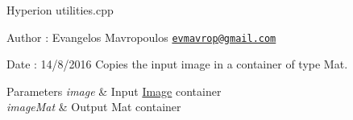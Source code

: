 Hyperion utilities.\+cpp

\begin{DoxyAuthor}{Author}
\+: Evangelos Mavropoulos \href{mailto:evmavrop@gmail.com}{\tt evmavrop@gmail.\+com} 
\end{DoxyAuthor}
\begin{DoxyDate}{Date}
\+: 14/8/2016 Copies the input image in a container of type Mat.
\end{DoxyDate}

\begin{DoxyParams}{Parameters}
{\em image} & Input \mbox{\hyperlink{classImage}{Image}} container \\
\hline
{\em image\+Mat} & Output Mat container \\
\hline
\end{DoxyParams}
